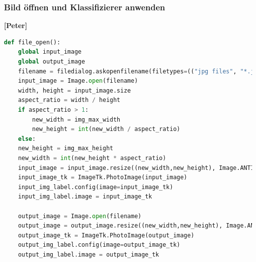 \documentclass{article}
\begin{document}

\subsubsection{Bild öffnen und Klassifizierer anwenden}
\textbf{[Peter]}
\begin{lstlisting}[language=Python]
def file_open():
	global input_image
	global output_image
	filename = filedialog.askopenfilename(filetypes=(("jpg files", "*.jpg"),("png files", "*.png")))
	input_image = Image.open(filename)
	width, height = input_image.size
	aspect_ratio = width / height
	if aspect_ratio > 1:
		new_width = img_max_width
		new_height = int(new_width / aspect_ratio)
	else:  
	new_height = img_max_height
	new_width = int(new_height * aspect_ratio)
	input_image = input_image.resize((new_width,new_height), Image.ANTIALIAS)
	input_image_tk = ImageTk.PhotoImage(input_image)
	input_img_label.config(image=input_image_tk)
	input_img_label.image = input_image_tk

	output_image = Image.open(filename)
	output_image = output_image.resize((new_width,new_height), Image.ANTIALIAS)
	output_image_tk = ImageTk.PhotoImage(output_image)
	output_img_label.config(image=output_image_tk)
	output_img_label.image = output_image_tk
\end{lstlisting}
\end{document}
